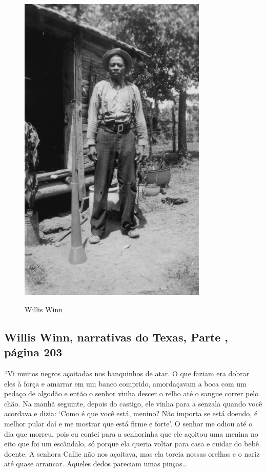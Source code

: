 \pagebreak
\thispagestyle{empty}
\begin{figure}[!ht]
\centering
 \includegraphics[width=90mm]{./imgs/williswill_recorte.jpg} \label{img9}
\caption{Willis Winn}
\end{figure}

\subsection{Willis Winn, narrativas do Texas, Parte , página 203}
\label{ref303}

``Vi muitos negros açoitadas nos banquinhos de atar. O que faziam era
dobrar eles à força e amarrar em um banco comprido, amordaçavam a boca
com um pedaço de algodão e então o senhor vinha descer o relho até o
sangue correr pelo chão. Na manhã seguinte, depois do castigo, ele vinha
para a senzala quando você acordava e dizia: `Como é que você está,
menino? Não importa se está doendo, é melhor pular daí e me mostrar que
está firme e forte'. O senhor me odiou até o dia que morreu, pois eu
contei para a senhorinha que ele açoitou uma menina no eito que foi um
escândalo, só porque ela queria voltar para casa e cuidar do bebê
doente. A senhora Callie não nos açoitava, mas ela torcia nossas orelhas
e o nariz até quase arrancar. Aqueles dedos pareciam umas pinças\ldots{}

